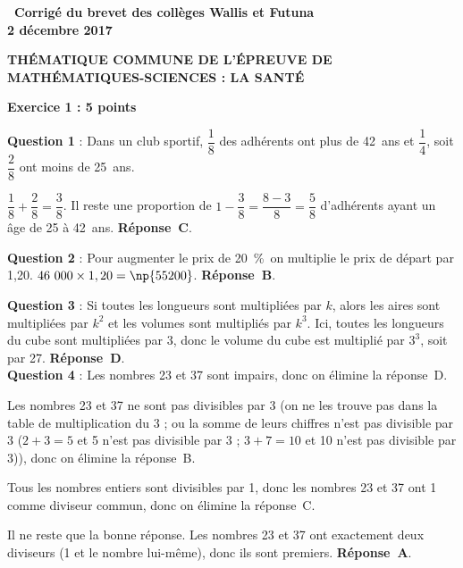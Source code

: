 \documentclass[10pt]{article}
\begin{document}
\setlength\parindent{0mm}
\pagestyle{fancy}
\thispagestyle{empty}
\begin{center}


{\Large \textbf{\decofourleft~Corrigé du brevet des collèges Wallis et Futuna~\decofourright\\[4pt]2 décembre 2017}}

\medskip

\textbf{THÉMATIQUE COMMUNE DE L'ÉPREUVE DE MATHÉMATIQUES-SCIENCES : LA SANTÉ}

\end{center}

\vspace{0.2cm}

\textbf{Exercice 1 :  \hfill 5 points}

\medskip

\textbf{Question 1} : Dans un club sportif, $\dfrac{1}{8}$ des adhérents ont plus de 42~ans et $\dfrac{1}{4}$, soit $\dfrac{2}{8}$ ont moins de 25~ans.

$\dfrac{1}{8}+\dfrac{2}{8}=\dfrac{3}{8}$. Il reste une proportion de $1 - \dfrac{3}{8} = \dfrac{8 - 3}{8} = \dfrac{5}{8}$ d'adhérents ayant un âge de 25 à  42~ans. \textbf{Réponse~C}.

\textbf{Question 2} : Pour augmenter le prix de 20~\%\, on multiplie le prix de départ par 1,20. $46~000\times 1,20=\np{55200}$. \textbf{Réponse~B}.

\textbf{Question 3} : Si toutes les longueurs sont multipliées par $k$, alors les aires sont multipliées par $k^2$ et les volumes sont multipliés par $k^3$. Ici, toutes les longueurs du cube sont multipliées par 3, donc le volume du cube est multiplié par $3^3$, soit par 27.  \textbf{Réponse~D}. \\[2mm]
\textbf{Question 4} : Les nombres 23 et 37 sont impairs, donc on élimine la réponse~D.

Les nombres 23 et 37 ne sont pas divisibles par 3 (on ne les trouve pas dans la table de multiplication du 3 ; ou la somme de leurs chiffres n’est pas divisible par 3 ($2+3=5$ et 5 n’est pas divisible par 3 ; $3+7 = 10$ et 10 n’est pas divisible par 3)), donc on élimine la réponse~B.

Tous les nombres entiers sont divisibles par 1, donc les nombres 23 et 37 ont 1 comme diviseur commun, donc on élimine la réponse~C.

Il ne reste que la bonne réponse. Les nombres 23 et 37 ont exactement deux diviseurs (1 et le nombre lui-même), donc ils sont premiers. \textbf{Réponse~A}.
\end{document}
